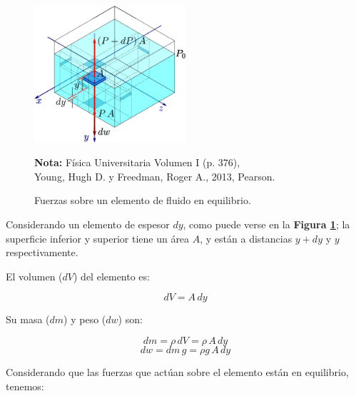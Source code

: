 \documentclass[letter,11pt]{article}
\newcommand{\source}[1]{\vspace{-11pt} \caption*{\small{\textbf{Nota:} {#1}}}}
\begin{document}
\begin{figure}
\centering
\includegraphics[width=0.50\textwidth]{resources/f1.eps}
\caption{Fuerzas sobre un elemento de fluido en equilibrio.}
\label{figura1}
\source{Física Universitaria Volumen I (p. 376), \\
Young, Hugh D. y Freedman, Roger A., 2013, Pearson.}
\end{figure}

Considerando un elemento de espesor $dy$, como puede verse en la
\textbf{Figura \ref{figura1}}; la superficie inferior y superior tiene un área
$A$, y están a distancias $y + dy$ y $y$ respectivamente.

El volumen ($dV$) del elemento es:

\begin{equation*}
    dV = A\,dy
\end{equation*}
\vspace{0.10cm}

Su masa ($dm$) y peso ($dw$) son:

\begin{equation*}
    dm = \rho\,dV = \rho\,A\,dy
\end{equation*}
\begin{equation}
    dw = dm\,g = \rho g\,A\,dy
\end{equation}
\vspace{0.10cm}

Considerando que las fuerzas que actúan sobre el elemento están en equilibrio,
tenemos:
\end{document}
